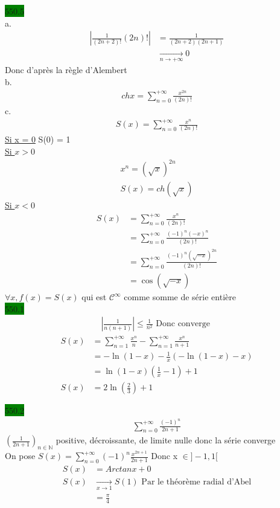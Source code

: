 \documentclass{article}
\begin{document}
\noindent \colorbox{green}{550.5}\\ 
a. 
\begin{align*}
  |\frac{1}{(2n+2)!}(2n)!| &= \frac{1}{(2n+2)(2n+1)}\\ 
                           &\xrightarrow[n \to +\infty]{} 0
\end{align*}
Donc d'après la règle d'Alembert \\ 
b. 
\begin{align*}
    ch x = \sum_{n=0}^{+\infty} \frac{x^{2n}}{(2n)!}
\end{align*}
c. 
\begin{align*}
    S(x) = \sum_{n=0}^{+\infty}\frac{x^{n}}{(2n)!}
\end{align*}
\underline{Si x = 0} S(0) = 1\\ 
\underline{Si \(x > 0\)} 
\begin{align*}
    x^{n} = (\sqrt{x})^{2n}\\ 
    S(x) = ch(\sqrt{x})
\end{align*}
\underline{Si \(x < 0\)}\\ 
\begin{align*}
  S(x) &= \sum_{n=0}^{+\infty}\frac{x^{n}}{(2n)!}\\ 
       &= \sum_{n=0}^{+\infty} \frac{(-1)^{n}(-x)^{n}}{(2n)!}\\ 
       &= \sum_{n=0}^{+\infty} \frac{(-1)^{n}(\sqrt{-x})^{2n}}{(2n)!}\\ 
       &= \cos(\sqrt{-x})
\end{align*}
\(\forall x, f(x) = S(x)\) qui est \(\mathcal{C}^{\infty}\) 
comme somme de série entière\\ 

\noindent \colorbox{green}{550.1}\\ 
\begin{align*}
  |\frac{1}{n(n+1)}| \leq \frac{1}{n^{2}} \text{ Donc converge }
\end{align*}
\begin{align*}
  S(x) &= \sum_{n=1}^{+\infty} \frac{x^{n}}{n} - \sum_{n=1}^{+\infty} \frac{x^{n}}{n+1} \\ 
       &= -\ln(1-x) - \frac{1}{x}(-\ln(1-x)-x)\\ 
       &= \ln(1-x)(\frac{1}{x}-1)+1\\ 
  S(x) &= 2\ln(\frac{2}{3}) + 1
\end{align*}

\noindent \colorbox{green}{550.2}\\ 
\begin{align*}
    \sum_{n=0}^{+\infty} \frac{(-1)^{n}}{2n+1}
\end{align*}
\((\frac{1}{2n+1})_{n \in \mathbb{N}}\) positive, décroissante,
de limite nulle donc la série converge \\ 
On pose \(S(x) = \sum_{n=0}^{+\infty}(-1)^{n} \frac{x^{2n+1}}{2n+1}\)
Donc x \(\in ]-1, 1[\)
\begin{align*}
  S(x) &= Arctan x + 0 \\ 
    S(x) &\xrightarrow[x \to 1]{} S(1) \text{ Par le théorème radial d'Abel} \\ 
         &= \frac{\pi}{4}
\end{align*}
\end{document}

